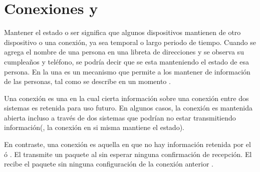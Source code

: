 \chapter{Conexiones \statefulINT y \statelessINT }\label{ap:apendice_connection_statful_stateless}

Mantener el estado o ser \statefulINT significa que algunos dispositivos mantienen \trackCPT de otro dispositivo o una conexión, ya sea temporal o largo periodo de tiempo. Cuando se agrega el nombre de una persona en una libreta de direcciones y se observa su cumpleaños y teléfono, se podría decir que se esta manteniendo el estado de esa persona. En la \webINT una \cookieINT es un mecanismo \statefulINT que permite a los \webserverINT mantener \trackCPT de información de las personas, tal como se describe en un momento \cite{online_connection_stateful_stateless}.


Una conexión \statefulINT es una en la cual cierta información sobre una conexión entre dos sistemas es retenida para uso futuro. En algunos casos, la conexión es mantenida abierta incluso a través de dos sistemas que podrían no estar transmitiendo información(\ieCPT, la conexión en si misma mantiene el estado)\cite{online_connection_stateful_stateless}.

En contraste, una conexión \statelessINT es aquella en que no hay información retenida por el \senderINT ó \receiverINT. El \senderINT transmite un paquete al \receiverINT sin esperar ninguna confirmación de recepción. El \receiverINT recibe el paquete sin ninguna configuración de la conexión anterior  \cite{online_connection_stateful_stateless}.
